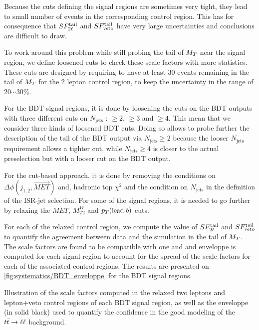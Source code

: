             Because the cuts defining the signal regions are sometimes very tight, they lead to
            small number of events in the corresponding control region. This has for consequence that
            $SF_{2\ell}^{\text{tail}}$ and $SF_{\text{veto}}^{\text{tail}}$ have very large uncertainties and conclusions are
            difficult to draw.

            To work around this problem while still probing the tail of $M_T$ near the signal
            region, we define loosened cuts to check these scale factors with more statistics.
            These cuts are designed by requiring to have at least 30 events remaining in the tail of
            $M_T$ for the 2 lepton control region, to keep the uncertainty in the range of 20$\sim$30\%.
            
            For the BDT signal regions, it is done by loosening the cuts on the BDT outputs with
            three different cuts on $N_\text{jets}$ : $\geq 2$, $\geq 3$ and $\geq 4$. This mean
            that we consider three kinds of loosened BDT cuts. Doing so allows to probe further the
            description of the tail of the BDT output via $N_\text{jets} \geq 2$ because the looser
            $N_\text{jets}$ requirement allows a tighter cut, while $N_\text{jets} \geq 4$ is closer
            to the actual preselection but with a looser cut on the BDT output. 

            For the cut-based approach, it is done by removing the conditions on $\Delta \phi( j_{1,2},
            \vec{MET} )$ and, hadronic top $\chi^2$ and the condition on $N_\text{jets}$ in the definition
            of the ISR-jet selection. For some of the signal regions, it is needed to go further by 
            relaxing the $MET$, $M_{T2}^W$ and $p_T(\text{lead.} b)$ cuts. 

            For each of the relaxed control region, we compute the value of $SF_{2\ell}^{\text{tail}}$ and
            $SF_{\text{veto}}^{\text{tail}}$ to quantify the agreement between data and the simulation in the tail of $M_T$.
            The scale factors are found to be compatible with one and and enveloppe is computed for
            each signal region to account for the spread of the scale factors for each of the
            associated control regions. The results are presented on \ref{fig:systematics/BDT_enveloppe} for
            the BDT signal regions.

                         {Illustration of the scale factors computed in the relaxed two leptons and lepton+veto control regions of each BDT signal region, as well as the enveloppe (in solid black) used to quantify the confidence in the good modeling of the $t\bar{t} \rightarrow \ell \ell$ background.}


